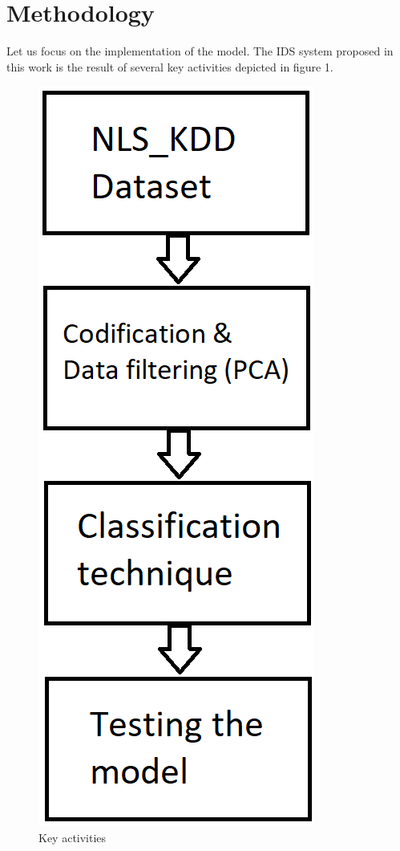 \documentclass[twocolumn,11pt]{asme2ej}
\begin{document}

\section{Methodology}

Let us focus on the implementation of the model. The IDS system proposed in this work is the result of several key activities depicted in figure 1.
\begin{figure}[h]
\centering
\includegraphics[scale=0.25]{Methodology2.png}
\caption{Key activities}
\end{figure}
\end{document}
